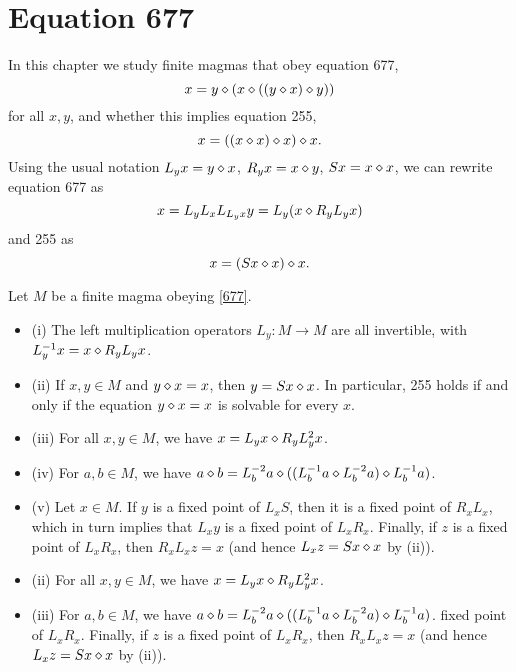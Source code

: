 \chapter{Equation 677}\label{677-chapter}

In this chapter we study finite magmas that obey equation 677,
\begin{equation}\label{677}
  x = y \diamond (x \diamond ((y \diamond x) \diamond y))
\end{equation}
for all $x,y$, and whether this implies equation 255,
\begin{equation}\label{255}
  x = ((x \diamond x) \diamond x) \diamond x.
\end{equation}
Using the usual notation $L_y x = y \diamond x$, $R_y x = x \diamond y$, $Sx = x \diamond x$, we can rewrite equation 677 as
\begin{equation}\label{677-alt}
  x = L_y L_x L_{L_y x} y = L_y (x \diamond R_y L_y x)
\end{equation}
and 255 as
$$ x = (Sx \diamond x) \diamond x.$$

\begin{lemma}\label{677-basic} Let $M$ be a finite magma obeying \eqref{677}.
  \begin{itemize}
  \item (i)  The left multiplication operators $L_y: M \to M$ are all invertible, with $L_y^{-1} x = x \diamond R_y L_y x$.
  \item (ii) If $x,y \in M$ and $y \diamond x = x$, then $y = Sx \diamond x$.  In particular, 255 holds if and only if the equation $y \diamond x = x$ is solvable for every $x$.
  \item (iii)  For all $x,y \in M$, we have $x = L_y x \diamond R_y L_y^2 x$.
  \item (iv) For $a,b \in M$, we have $a \diamond b = L_b^{-2} a \diamond ((L_b^{-1} a \diamond L_b^{-2} a) \diamond L_b^{-1} a)$.
  \item (v) Let $x \in M$.  If $y$ is a fixed point of $L_x S$, then it is a fixed point of $R_x L_x$, which in turn implies that $L_x y$ is a fixed point of $L_x R_x$.  Finally, if $z$ is a fixed point of $L_x R_x$, then $R_x L_x z = x$ (and hence $L_x z = Sx \diamond x$ by (ii)).
  \item (ii)  For all $x,y \in M$, we have $x = L_y x \diamond R_y L_y^2 x$.
  \item (iii) For $a,b \in M$, we have $a \diamond b = L_b^{-2} a \diamond ((L_b^{-1} a \diamond L_b^{-2} a) \diamond L_b^{-1} a)$.
fixed point of $L_x R_x$.  Finally, if $z$ is a fixed point of $L_x R_x$, then $R_x L_x z = x$ (and hence $L_x z = Sx \diamond x$ by (ii)).
\end{itemize}
\end{lemma}

